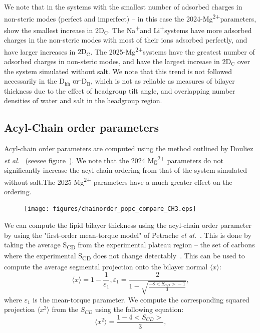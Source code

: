 \documentclass[12pt,openany,final]{book}
\newcommand{\etal}{\textit{et al.}}
\newcommand{\db}{$\text{D}_\text{B}$}
\newcommand{\dhh}{$\text{D}_\text{hh}$}
\newcommand{\dc}{$\text{2D}_\text{C}$}
\newcommand{\na}{Na\textsuperscript{+}}
\newcommand{\li}{Li\textsuperscript{+}}
\newcommand{\mg}{Mg\textsuperscript{2+}}
\begin{document}
We note that in the systems with the smallest number of adsorbed charges in non-steric modes (perfect and imperfect) -- in this case the 2024-\mg parameters, show
the smallest increase in \dc{}. The \na and \li systems have more adsorbed charges in the non-steric modes with most of their ions adsorbed perfectly,
and have larger increases in \dc{}. The 2025-\mg systems have the greatest number of adsorbed charges in non-steric modes, and have the largest increase in \dc{} over the system simulated without salt. We note that
this trend is not followed necessarily in the \dhh{} \st{or \db{}}, which is not as reliable as measures of bilayer thickness due to the effect of headgroup tilt angle, and overlapping number densities of water
and salt in the headgroup region.
\subsection{Acyl-Chain order parameters}
Acyl-chain order parameters are computed using the method outlined by Douliez \etal~\cite{Douliez:1995} (seesee  figure~\label{fig:acylorder}). We note that
the 2024 \mg{} parameters do not significantly increase the acyl-chain ordering from that of the system simulated without salt.The 2025 \mg{} parameters have a much greater effect on the ordering.
\begin{figure}[H]
    \caption[Acyl-Chain order parameters]{ }
    \label{fig:acylorder}
    \texttt{[image: figures/chainorder\_popc\_compare\_CH3.eps]}
\end{figure}
We can compute the lipid bilayer thickness using the acyl-chain order parameter by using the
"first-order mean-torque model" of Petrache \etal~\cite{petrache:2000:nmrarea,nagle:2000}.
This is done by taking the average S\textsubscript{CD} from the experimental plateau region -- the set of carbons where the experimental S\textsubscript{CD} does not change
detectably~\cite{nagle:2000,nagle:1993:nmrarea}. This can be used to compute the average segmental projection onto the bilayer normal $\langle x \rangle$:
\begin{equation}
    \langle x \rangle = 1 - \frac{1}{\varepsilon_1}, \varepsilon_1 = \frac{2}{1 - \sqrt{\frac{-8\big<S_{CD}\big> - 1}{3}}}\text{,}
\end{equation}
where $\varepsilon_1$ is the mean-torque parameter. We compute the corresponding squared projection $\langle x^2 \rangle$ from the $S_{CD}$
using the following equation:
\begin{equation}
    \langle x^2 \rangle = \frac{1 - 4\big<S_{CD}\big>}{3}\text{,}
\end{equation}
\end{document}
